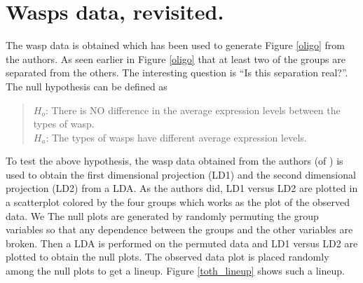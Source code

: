 \documentclass[12]{article}
\begin{document}

\section{Wasps data, revisited. }


The wasp data is obtained which has been used to generate Figure \ref{oligo} from the authors.  As seen earlier in Figure \ref{oligo} that at least two of the groups are separated from the others.  The interesting question is ``Is this separation real?''. The null hypothesis can be defined as 

\begin{quote}
$H_o$: There is NO difference in the average expression levels between the types of wasp.\\
$H_a$: The types of wasps have different average expression levels.
\end{quote}


To test the above hypothesis, the wasp data obtained from the authors (of \cite{toth:2010}) is used to obtain the first dimensional projection (LD1) and the second dimensional projection (LD2) from a LDA. As the authors did, LD1 versus LD2 are plotted in a scatterplot colored by the four groups which works as the plot of the observed data. We The null plots are generated by randomly permuting the group variables so that any dependence between the groups and the other variables are broken. Then a LDA is performed on the permuted data and LD1 versus LD2 are plotted to obtain the null plots. The observed data plot is placed randomly among the null plots to get a lineup. Figure \ref{toth_lineup} shows such a lineup.
\end{document}
